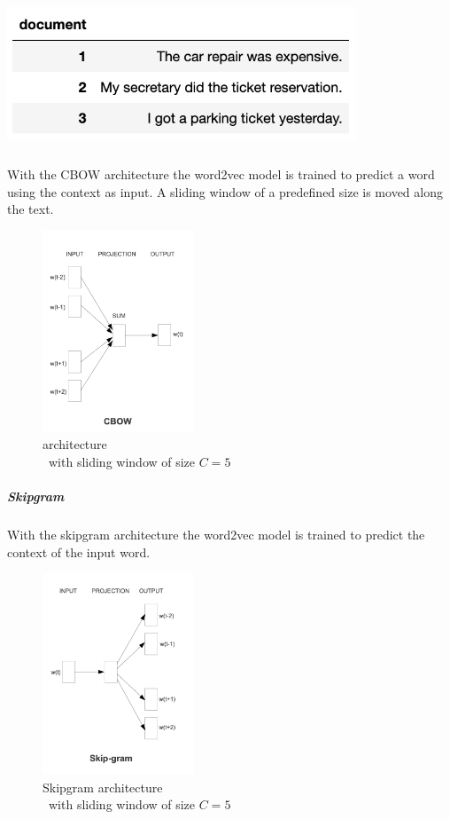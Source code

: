             \includegraphics[height=4cm]{Bilder/word2vec/documents.png}
            
            \subparagraph{} 
            With the \ac{CBOW} architecture the word2vec model is trained to predict a word using the context as input. A sliding window of a predefined size is moved along the text. 
            
            \begin{figure}[ht]
                \centering
                \includegraphics[height=6cm]{Bilder/word2vec/architecture_cbow.png}
                \caption{ architecture\\\ with sliding window of size $C=5$ }
                \label{fig:cbow-architecture}
            \end{figure}
        
            \subparagraph{Skipgram} 
            With the skipgram architecture the word2vec model is trained to predict the context of the input word.
            
            \begin{figure}[ht]
                \centering
                \includegraphics[height=6cm]{Bilder/word2vec/architecture_skipgram.png}
                \caption{Skipgram architecture\\\ with sliding window of size $C=5$ }
                \label{fig:cbow-architecture}
            \end{figure}
        
